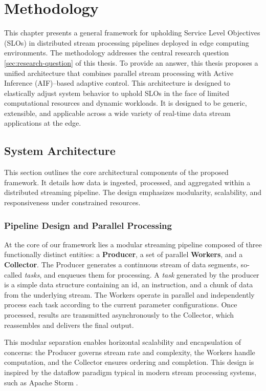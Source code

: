 \chapter{Methodology}
\label{chap:methodology}

This chapter presents a general framework for upholding Service Level Objectives (SLOs) in distributed stream processing pipelines deployed in edge computing environments. The methodology addresses the central research question \ref{sec:research-question} of this thesis. To provide an answer, this thesis proposes a unified architecture that combines parallel stream processing with Active Inference (AIF)–based adaptive control. This architecture is designed to elastically adjust system behavior to uphold SLOs in the face of limited computational resources and dynamic workloads. It is designed to be generic, extensible, and applicable across a wide variety of real-time data stream applications at the edge.

\section{System Architecture}
This section outlines the core architectural components of the proposed framework. It details how data is ingested, processed, and aggregated within a distributed streaming pipeline. The design emphasizes modularity, scalability, and responsiveness under constrained resources.

\subsection{Pipeline Design and Parallel Processing}
At the core of our framework lies a modular streaming pipeline composed of three functionally distinct entities: a\textbf{ Producer}, a set of parallel \textbf{Workers}, and a \textbf{Collector}. The Producer generates a continuous stream of data segments, so-called \textit{tasks}, and enqueues them for processing. A \textit{task} generated by the producer is a simple data structure containing an id, an instruction, and a chunk of data from the underlying stream. The Workers operate in parallel and independently process each task according to the current parameter configurations. Once processed, results are transmitted asynchronously to the Collector, which reassembles and delivers the final output. 

This modular separation enables horizontal scalability and encapsulation of concerns: the Producer governs stream rate and complexity, the Workers handle computation, and the Collector ensures ordering and completion. This design is inspired by the dataflow paradigm typical in modern stream processing systems, such as Apache Storm \cite{carbone_apache_2015, noauthor_apache_nodate}. 


